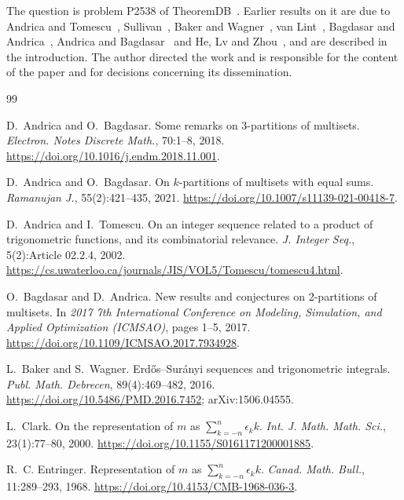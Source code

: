 \documentclass[11pt]{article}
\theoremstyle{remark}
\begin{document}
The question is problem P2538 of TheoremDB~\cite{TDB}. Earlier results on it are due to Andrica and Tomescu~\cite{AT02}, Sullivan~\cite{Sul13}, Baker and Wagner~\cite{BW16}, van Lint~\cite{vL67}, Bagdasar and Andrica~\cite{BA17}, Andrica and Bagdasar~\cite{AB21} and He, Lv and Zhou~\cite{HLZ23}, and are described in the introduction. The author directed the work and is responsible for the content of the paper and for decisions concerning its dissemination.

\begin{thebibliography}{99}

D.~Andrica and O.~Bagdasar.
\newblock Some remarks on 3-partitions of multisets.
\newblock \emph{Electron. Notes Discrete Math.}, 70:1--8, 2018.
\newblock \url{https://doi.org/10.1016/j.endm.2018.11.001}.

D.~Andrica and O.~Bagdasar.
\newblock On $k$-partitions of multisets with equal sums.
\newblock \emph{Ramanujan J.}, 55(2):421--435, 2021.
\newblock \url{https://doi.org/10.1007/s11139-021-00418-7}.

D.~Andrica and I.~Tomescu.
\newblock On an integer sequence related to a product of trigonometric functions, and its combinatorial relevance.
\newblock \emph{J. Integer Seq.}, 5(2):Article 02.2.4, 2002.
\newblock \url{https://cs.uwaterloo.ca/journals/JIS/VOL5/Tomescu/tomescu4.html}.

O.~Bagdasar and D.~Andrica.
\newblock New results and conjectures on 2-partitions of multisets.
\newblock In \emph{2017 7th International Conference on Modeling, Simulation, and Applied Optimization (ICMSAO)}, pages 1--5, 2017.
\newblock \url{https://doi.org/10.1109/ICMSAO.2017.7934928}.

L.~Baker and S.~Wagner.
\newblock Erd\H{o}s--Sur\'anyi sequences and trigonometric integrals.
\newblock \emph{Publ. Math. Debrecen}, 89(4):469--482, 2016.
\newblock \url{https://doi.org/10.5486/PMD.2016.7452}; arXiv:1506.04555.

L.~Clark.
\newblock On the representation of $m$ as $\sum_{k=-n}^{n}\epsilon_k k$.
\newblock \emph{Int. J. Math. Math. Sci.}, 23(1):77--80, 2000.
\newblock \url{https://doi.org/10.1155/S0161171200001885}.

R.~C. Entringer.
\newblock Representation of $m$ as $\sum_{k=-n}^{n}\epsilon_k k$.
\newblock \emph{Canad. Math. Bull.}, 11:289--293, 1968.
\newblock \url{https://doi.org/10.4153/CMB-1968-036-3}.


\end{thebibliography}
\end{document}
